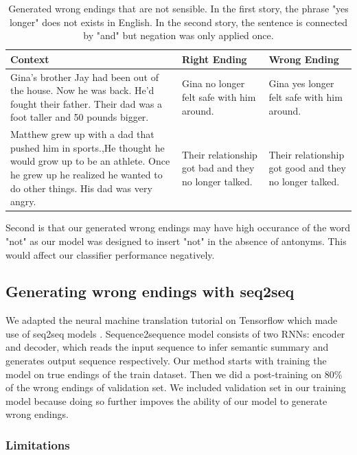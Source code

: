 \documentclass{article}
\begin{document}
\begin{table}[h]\footnotesize
  \centering
  \begin{tabular}{ p{6cm} p{3cm} p{3cm} }
    \toprule
    Context & Right Ending & Wrong Ending \\
    \midrule
    Gina's brother Jay had been out of the house. Now he was back. He'd fought their father. Their dad was a foot taller and 50 pounds bigger. & Gina no longer felt safe with him around. & Gina yes longer felt safe with him around.\\
    \hline
    Matthew grew up with a dad that pushed him in sports.,He thought he would grow up to be an athlete. Once he grew up he realized he wanted to do other things. His dad was very angry. & Their relationship got bad and they no longer talked. & Their relationship got good and they no longer talked. \\
  \bottomrule

  \end{tabular}
  \label{Tab:strange}
  \caption{Generated wrong endings that are not sensible. In the first story, the phrase "yes longer" does not exists in English. In the second story, the sentence is connected by "and" but negation was only applied once.}
\end{table}

Second is that our generated wrong endings may have high occurance of the word "not" as our model was designed to insert "not" in the absence of antonyms. This would affect our classifier performance negatively.

\subsection{Generating wrong endings with seq2seq}
We adapted the neural machine translation tutorial on Tensorflow which made use of seq2seq models \cite{tfseq2seq}. Sequence2sequence model consists of two RNNs: encoder and decoder, which reads the  input sequence to infer semantic summary and generates output sequence respectively. Our method starts with training the model on true endings of the train dataset. Then we did a post-training on 80\% of the wrong endings of validation set. We included validation set in our training model because doing so further impoves the ability of our model to generate wrong endings.


\subsubsection{Limitations}
\end{document}
